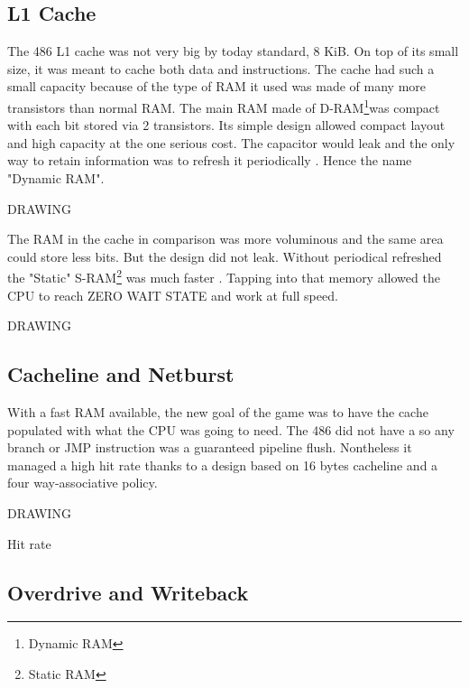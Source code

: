\subsection{L1 Cache}
The 486 L1 cache was not very big by today standard, 8 KiB. On top of its small size, it was meant to cache both data and instructions. The cache had such a small capacity because of the type of RAM it used was made of many more transistors than normal RAM. The main RAM made of D-RAM\footnote{Dynamic RAM}was compact with each bit stored via 2 transistors. Its simple design allowed compact layout and high capacity at the one serious cost. The capacitor would leak and the only way to retain information was to refresh it periodically . Hence the name "Dynamic RAM".\\
\par
DRAWING\\
\par
The RAM in the cache in comparison was more voluminous and the same area could store less bits. But the design did not leak. Without periodical refreshed the "Static" S-RAM\footnote{Static RAM} was much faster . Tapping into that memory allowed the CPU to reach ZERO WAIT STATE and work at full speed. 
\par
DRAWING\\
\par

\subsection{Cacheline and Netburst}
With a fast RAM available, the new goal of the game was to have the cache populated with what the CPU was going to need. The 486 did not have a  so any branch or JMP instruction was a guaranteed pipeline flush. Nontheless it managed a high hit rate thanks to a design based on 16 bytes cacheline and a four way-associative policy.\\
\par
DRAWING\\
\par
Hit rate









\subsection{Overdrive and Writeback}


